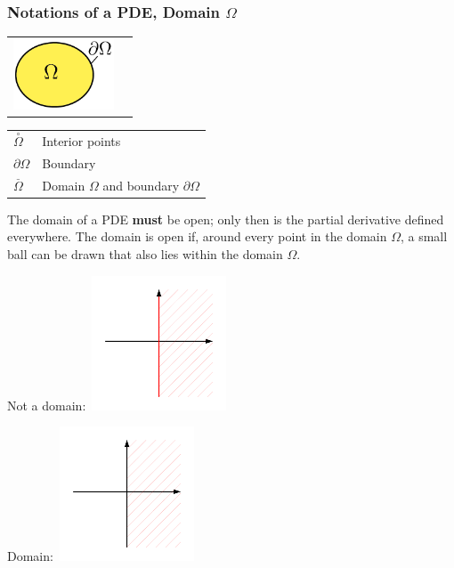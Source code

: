 \subsubsection{Notations of a PDE, Domain $\Omega$}
\begin{minipage}{4cm}
	\begin{tabular}{ll}
	\includegraphics[width=3cm]{Content/01_theory/Gebiet}&
	\end{tabular}
\end{minipage}
\begin{minipage}{4cm}
	\begin{tabular}{ll}
		$\overset{\circ}{\Omega}$ & Interior points\\
		$\partial\Omega$ & Boundary\\
		$\overset{\_}{\Omega}$ & Domain $\Omega$ and boundary $\partial\Omega$\\
	\end{tabular}
\end{minipage}

The domain of a PDE \textbf{must} be open; only then is the partial derivative defined everywhere. The domain is open if, around every point in the domain $\Omega$, a small ball can be drawn that also lies within the domain $\Omega$.\

\begin{minipage}{4cm}
Not a domain:\
\includegraphics[width=4cm]{Content/01_theory/gebiet_1.pdf}\\

\end{minipage}
\begin{minipage}{4cm}
Domain:\
\includegraphics[width=4cm]{Content/01_theory/gebiet_2.pdf}\\
\end{minipage}

